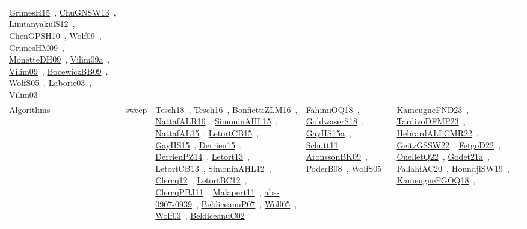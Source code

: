 {\begin{longtable}{lp{3cm}>{\raggedright\arraybackslash}p{6cm}>{\raggedright\arraybackslash}p{6cm}>{\raggedright\arraybackslash}p{8cm}}
\href{works/GrimesH15.pdf}{GrimesH15}~\cite{GrimesH15}, \href{works/ChuGNSW13.pdf}{ChuGNSW13}~\cite{ChuGNSW13}, \href{works/LimtanyakulS12.pdf}{LimtanyakulS12}~\cite{LimtanyakulS12}, \href{works/ChenGPSH10.pdf}{ChenGPSH10}~\cite{ChenGPSH10}, \href{works/Wolf09.pdf}{Wolf09}~\cite{Wolf09}, \href{works/GrimesHM09.pdf}{GrimesHM09}~\cite{GrimesHM09}, \href{works/MonetteDH09.pdf}{MonetteDH09}~\cite{MonetteDH09}, \href{works/Vilim09a.pdf}{Vilim09a}~\cite{Vilim09a}, \href{works/Vilim09.pdf}{Vilim09}~\cite{Vilim09}, \href{works/BocewiczBB09.pdf}{BocewiczBB09}~\cite{BocewiczBB09}, \href{works/WolfS05.pdf}{WolfS05}~\cite{WolfS05}, \href{works/Laborie03.pdf}{Laborie03}~\cite{Laborie03}, \href{works/Vilim03.pdf}{Vilim03}~\cite{Vilim03}\\
Algorithms & sweep & \href{works/Tesch18.pdf}{Tesch18}~\cite{Tesch18}, \href{works/Tesch16.pdf}{Tesch16}~\cite{Tesch16}, \href{works/BonfiettiZLM16.pdf}{BonfiettiZLM16}~\cite{BonfiettiZLM16}, \href{works/NattafALR16.pdf}{NattafALR16}~\cite{NattafALR16}, \href{works/SimoninAHL15.pdf}{SimoninAHL15}~\cite{SimoninAHL15}, \href{works/NattafAL15.pdf}{NattafAL15}~\cite{NattafAL15}, \href{works/LetortCB15.pdf}{LetortCB15}~\cite{LetortCB15}, \href{works/GayHS15.pdf}{GayHS15}~\cite{GayHS15}, \href{works/Derrien15.pdf}{Derrien15}~\cite{Derrien15}, \href{works/DerrienPZ14.pdf}{DerrienPZ14}~\cite{DerrienPZ14}, \href{works/Letort13.pdf}{Letort13}~\cite{Letort13}, \href{works/LetortCB13.pdf}{LetortCB13}~\cite{LetortCB13}, \href{works/SimoninAHL12.pdf}{SimoninAHL12}~\cite{SimoninAHL12}, \href{works/Clercq12.pdf}{Clercq12}~\cite{Clercq12}, \href{works/LetortBC12.pdf}{LetortBC12}~\cite{LetortBC12}, \href{works/ClercqPBJ11.pdf}{ClercqPBJ11}~\cite{ClercqPBJ11}, \href{works/Malapert11.pdf}{Malapert11}~\cite{Malapert11}, \href{works/abs-0907-0939.pdf}{abs-0907-0939}~\cite{abs-0907-0939}, \href{works/BeldiceanuP07.pdf}{BeldiceanuP07}~\cite{BeldiceanuP07}, \href{works/Wolf05.pdf}{Wolf05}~\cite{Wolf05}, \href{works/Wolf03.pdf}{Wolf03}~\cite{Wolf03}, \href{works/BeldiceanuC02.pdf}{BeldiceanuC02}~\cite{BeldiceanuC02} & \href{works/FahimiOQ18.pdf}{FahimiOQ18}~\cite{FahimiOQ18}, \href{works/GoldwaserS18.pdf}{GoldwaserS18}~\cite{GoldwaserS18}, \href{works/GayHS15a.pdf}{GayHS15a}~\cite{GayHS15a}, \href{works/Schutt11.pdf}{Schutt11}~\cite{Schutt11}, \href{works/AronssonBK09.pdf}{AronssonBK09}~\cite{AronssonBK09}, \href{works/PoderB08.pdf}{PoderB08}~\cite{PoderB08}, \href{works/WolfS05.pdf}{WolfS05}~\cite{WolfS05} & \href{works/KameugneFND23.pdf}{KameugneFND23}~\cite{KameugneFND23}, \href{works/TardivoDFMP23.pdf}{TardivoDFMP23}~\cite{TardivoDFMP23}, \href{works/HebrardALLCMR22.pdf}{HebrardALLCMR22}~\cite{HebrardALLCMR22}, \href{works/GeitzGSSW22.pdf}{GeitzGSSW22}~\cite{GeitzGSSW22}, \href{works/FetgoD22.pdf}{FetgoD22}~\cite{FetgoD22}, \href{works/OuelletQ22.pdf}{OuelletQ22}~\cite{OuelletQ22}, \href{works/Godet21a.pdf}{Godet21a}~\cite{Godet21a}, \href{works/FallahiAC20.pdf}{FallahiAC20}~\cite{FallahiAC20}, \href{works/HoundjiSW19.pdf}{HoundjiSW19}~\cite{HoundjiSW19}, \href{works/KameugneFGOQ18.pdf}{KameugneFGOQ18}~\cite{KameugneFGOQ18}, 
\end{longtable}}
